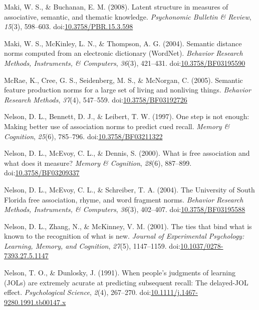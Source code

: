 \documentclass[english,,man]{apa6}
\begin{document}
\leavevmode\hypertarget{ref-Maki2008}{}%
Maki, W. S., \& Buchanan, E. M. (2008). Latent structure in measures of associative, semantic, and thematic knowledge. \emph{Psychonomic Bulletin \& Review}, \emph{15}(3), 598--603. doi:\href{https://doi.org/10.3758/PBR.15.3.598}{10.3758/PBR.15.3.598}

\leavevmode\hypertarget{ref-Maki2004}{}%
Maki, W. S., McKinley, L. N., \& Thompson, A. G. (2004). Semantic distance norms computed from an electronic dictionary (WordNet). \emph{Behavior Research Methods, Instruments, \& Computers}, \emph{36}(3), 421--431. doi:\href{https://doi.org/10.3758/BF03195590}{10.3758/BF03195590}

\leavevmode\hypertarget{ref-McRae2005}{}%
McRae, K., Cree, G. S., Seidenberg, M. S., \& McNorgan, C. (2005). Semantic feature production norms for a large set of living and nonliving things. \emph{Behavior Research Methods}, \emph{37}(4), 547--559. doi:\href{https://doi.org/10.3758/BF03192726}{10.3758/BF03192726}

\leavevmode\hypertarget{ref-Nelson1997}{}%
Nelson, D. L., Bennett, D. J., \& Leibert, T. W. (1997). One step is not enough: Making better use of association norms to predict cued recall. \emph{Memory \& Cognition}, \emph{25}(6), 785--796. doi:\href{https://doi.org/10.3758/BF03211322}{10.3758/BF03211322}

\leavevmode\hypertarget{ref-Nelson2000}{}%
Nelson, D. L., McEvoy, C. L., \& Dennis, S. (2000). What is free association and what does it measure? \emph{Memory \& Cognition}, \emph{28}(6), 887--899. doi:\href{https://doi.org/10.3758/BF03209337}{10.3758/BF03209337}

\leavevmode\hypertarget{ref-Nelson2004}{}%
Nelson, D. L., McEvoy, C. L., \& Schreiber, T. A. (2004). The University of South Florida free association, rhyme, and word fragment norms. \emph{Behavior Research Methods, Instruments, \& Computers}, \emph{36}(3), 402--407. doi:\href{https://doi.org/10.3758/BF03195588}{10.3758/BF03195588}

\leavevmode\hypertarget{ref-Nelson2001}{}%
Nelson, D. L., Zhang, N., \& McKinney, V. M. (2001). The ties that bind what is known to the recognition of what is new. \emph{Journal of Experimental Psychology: Learning, Memory, and Cognition}, \emph{27}(5), 1147--1159. doi:\href{https://doi.org/10.1037/0278-7393.27.5.1147}{10.1037/0278-7393.27.5.1147}

\leavevmode\hypertarget{ref-Nelson1991}{}%
Nelson, T. O., \& Dunlosky, J. (1991). When people's judgments of learning (JOLs) are extremely acurate at predicting subsequent recall: The delayed-JOL effect. \emph{Psychological Science}, \emph{2}(4), 267--270. doi:\href{https://doi.org/10.1111/j.1467-9280.1991.tb00147.x}{10.1111/j.1467-9280.1991.tb00147.x}
\end{document}
